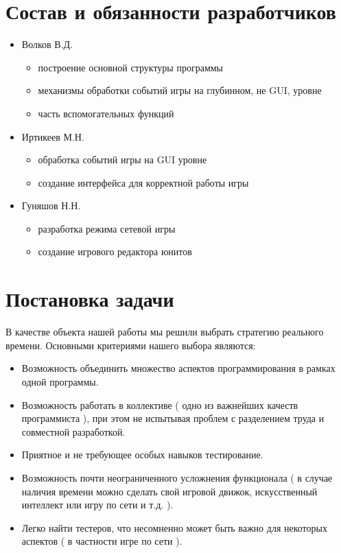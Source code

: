 \documentclass[a4paper,12pt,fleqn]{article} %
\begin{document}
\section{Состав и обязанности разработчиков}
\begin{itemize}
    \item Волков В.Д.
        \begin{itemize}
            \item построение основной структуры программы
            \item механизмы обработки событий игры на глубинном, не GUI, уровне
            \item часть вспомогательных функций
        \end{itemize}
    \item Иртикеев М.Н.
        \begin{itemize}
            \item обработка событий игры на GUI уровне
            \item создание интерфейса для корректной работы игры
        \end{itemize}
    \item Гуняшов Н.Н.
        \begin{itemize}
            \item разработка режима сетевой игры
            \item создание игрового редактора юнитов
        \end{itemize}
\end{itemize}

\newpage
\section{Постановка задачи}
В качестве объекта нашей работы мы решили выбрать стратегию реального времени.
Основными критериями нашего выбора являются:
\begin{itemize}
    \item Возможность объединить множество аспектов программирования в рамках одной программы.
    \item Возможность работать в коллективе ( одно из важнейших качеств программиста ), при этом не испытывая проблем с разделением труда и совместной разработкой.
    \item Приятное и не требующее особых навыков тестирование.
    \item Возможность почти неограниченного усложнения функционала ( в случае наличия времени можно сделать свой игровой движок, искусственный интеллект или игру по сети и т.д. ). 
    \item Легко найти тестеров, что несомненно может быть важно для некоторых аспектов ( в частности игре по сети ).
\end{itemize}
\newpage
\end{document}
